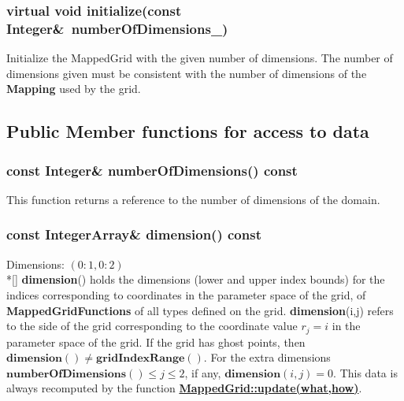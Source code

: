 \documentclass{article}
\begin{document}
  \subsubsection{virtual void initialize(const Integer\&~numberOfDimensions\_)}
  \label{MappedGrid::initialize(numberOfDimensions_)}
    Initialize the MappedGrid with the given number of dimensions.
    The number of dimensions given must be consistent with the number of dimensions of the \textbf{Mapping} used by the grid.

\subsection{Public Member functions for access to data}
\label{MappedGrid::PublicAccessToData}

  \subsubsection{const Integer\& numberOfDimensions() const}
  \label{MappedGrid::numberOfDimensions() const}
    This function returns a reference to the number of dimensions of the domain.

  \subsubsection{const IntegerArray\& dimension() const}
  \label{MappedGrid::dimension()}
    Dimensions: $(0\colon1,0\colon2)$ \\*[\parskip]
    \textbf{dimension}() holds the dimensions (lower and upper index bounds)
    for the indices corresponding to coordinates in the parameter space of the
    grid, of \textbf{MappedGridFunctions} of all types defined on the grid.
    \textbf{dimension}(i,j) refers to the side of the grid corresponding to the
    coordinate value $r_j = i$ in the parameter space of the grid.  If the grid
    has ghost points, then $\textbf{dimension}() \ne \textbf{gridIndexRange}()$.
    For the extra dimensions $\textbf{numberOfDimensions}()\le j \le 2$, if any, $\textbf{dimension}(i,j)=0$.
    This data is always recomputed by the function
    {\bf{}\hyperref{update(what,how)}{update(what,how) \rm(\S}{)}{MappedGrid::update(what,how)}}.
\end{document}
